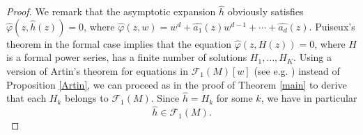 \documentclass[a4paper]{amsart}
\theoremstyle{plain}
\theoremstyle{remark}
\begin{document}
\begin{proof}
We remark that the asymptotic expansion $ \widehat{h} $ obviously satisfies $ \widehat{\varphi}(z,\widehat{h}(z))=0 $, where $ \widehat{\varphi}(z,w)=w^d+\widehat{a_1}(z)w^{d-1}+\cdots+\widehat{a_d}(z) $.
Puiseux's theorem in the formal case implies that the equation 
$ \widehat{\varphi}(z,H(z))=0 $, where $ H $ is a formal power series, has a finite number of solutions $ H_1,\ldots,H_K $. Using a version of Artin's theorem for equations in $ \mathcal{F}_1(M)[w] $ (see e.g. \cite{Mouze}) instead of Proposition \ref{Artin}, we can proceed as in the proof of Theorem \ref{main} to derive that each $ H_k $ belongs to $\mathcal{F}_1(M) $. Since $ \widehat{h}=H_k $ for some $ k $, we have in particular
\begin{equation}\label{hinF1M}
\widehat{h}\in \mathcal{F}_1(M).
\end{equation}


\end{proof}
\end{document}
